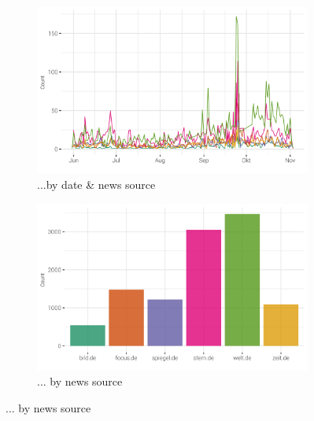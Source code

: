 \documentclass[12pt,a4paper,notitlepage]{article}
\begin{document}
\begin{figure}[H]
	\caption{Article distribution...}
	\begin{center}
		\begin{subfigure}[normla]{0.49\textwidth}
			\includegraphics[width=\textwidth]{../figs/timeline.png}
			\caption{...by date \& news source}
			\label{fig_distr1}
		\end{subfigure}
		\begin{subfigure}[normla]{0.49\textwidth}
			\includegraphics[width=\textwidth]{../figs/bar.png}
			\caption{... by news source}
			\label{fig_distr2}
		\end{subfigure}
	\end{center}
\end{figure}
\end{document}
